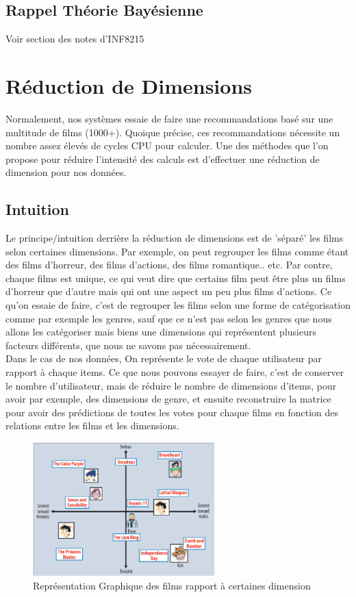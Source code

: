 \documentclass[oneside]{book}
\begin{document}
\section{Rappel Théorie Bayésienne}

Voir section des notes d'INF8215

\chapter{Réduction de Dimensions}
Normalement, nos systèmes essaie de faire une recommandations basé sur une multitude de films (1000+). Quoique précise, ces recommandations nécessite un nombre assez élevés de cycles CPU pour calculer. Une des méthodes que l'on propose pour réduire l'intensité des calculs est d'effectuer une réduction de dimension pour nos données.\\
\section{Intuition}
Le principe/intuition derrière la réduction de dimensions est de 'séparé' les films selon certaines dimensions. Par exemple, on peut regrouper les films comme étant des films d'horreur, des films d'actions, des films romantique.. etc. Par contre, chaque films est unique, ce qui veut dire que certains film peut être plus un films d'horreur que d'autre mais qui ont une aspect un peu plus films d'actions. Ce qu'on essaie de faire, c'est de regrouper les films selon une forme de catégorisation comme par exemple les genres, sauf que ce n'est pas selon les genres que nous allons les catégoriser mais biens une dimensions qui représentent plusieurs facteurs différents, que nous ne savons pas nécessairement.\\

Dans le cas de nos données, On représente le vote de chaque utilisateur par rapport à chaque items. Ce que nous pouvons essayer de faire, c'est de conserver le nombre d'utilisateur, mais de réduire le nombre de dimensions d'items, pour avoir par exemple, des dimensions de genre, et ensuite reconstruire la matrice pour avoir des prédictions de toutes les votes pour chaque films en fonction des relations entre les films et les dimensions.\\

\begin{figure}[!ht]
\centering
\includegraphics[width = 7cm]{graphic_representation.png}
\caption{Représentation Graphique des films rapport à certaines dimension}
\label{fig:representation_graphique}
\end{figure}
\end{document}
